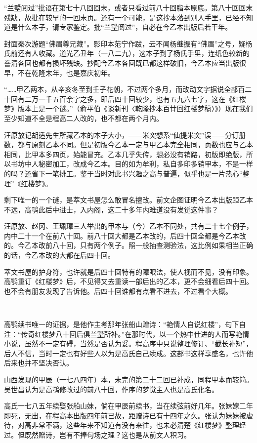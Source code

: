 \par “兰墅阅过”批语在第七十八回回末，或者只看过前八十回脂本原底。第八十回回末残缺，故批在较早的一回末页。还有一个可能，是这抄本落到别人手里，已经不知道是什么本子，请专家鉴定。批“兰墅阅过”，自必在今乙本出版后若干年。
\par 封面秦次游题“佛眉尊兄藏”。影印本范宁作跋，云不闻杨继振有“佛眉”之号，疑杨氏前还有人收藏。道光乙丑年（一八二九），这本子到了杨氏手里，连纸色较新的誊清各回也都有损坏残缺。抄配今乙本各回既已都这样破旧，今乙本应当出版很早，不在乾隆末年，也是嘉庆初年。
\par “……甲乙两本，从辛亥冬至到壬子花朝，不过两个多月，而改动文字据说全部百二十回有二万一千五百余字之多，即后四十回较少，也有五九六七字，这在《红楼梦》版本上是一个谜。”（俞平伯《谈新刊〈乾隆抄本百廿回红楼梦稿〉》）现在我们至少知道不全是程高二人改的，也不都在两个月内。
\par 汪原放记胡适先生所藏乙本的本子大小，——米突想系“仙提米突”误——分订册数，都与原刻乙本不同。但是初版今乙本一定与甲乙本完全相同，页数也应与乙本相同，比甲本多四页，始能冒充。乙本几乎失传，想必没有销路，初版即绝版，所以书坊中人秘密加工，改成今乙本。目的如为牟利，私自多印多销甲本，不是一样的吗？还省下一笔排工。鉴于当时对此书兴趣之高与普遍，似乎也是一片热心“整理”《红楼梦》。
\par 剩下唯一的一个谜，是萃文书屋怎么敢冒名擅改。前文企图证明今乙本出版距乙本不远，高鹗此后中进士，入内阁，这二十多年内难道没有发觉这件事？
\par 汪原放、赵冈、王珮璋三人举出的甲本与（今）乙本不同处，共有二十七个例子，内中二十一个在前八十回。前八十回大都是乙本改的，后四十回全都是今乙本改的。今乙本改前八十回，只有两个例子。照一般抽查测验法，这比例如果相当正确的话，今乙本改的大都在后四十回。
\par 萃文书屋的护身符，也许就是后四十回特有的障眼法，使人视而不见，没有印象。高鹗重订《红楼梦》后，不见得又去重读一部后出的乙本，更不会细看后四十回。也不会有朋友发现了告诉他。后四十回谁都有点看不进去，不过看个大概。
\par  
\par 高鹗续书唯一的证据，是他作主考那年张船山赠诗：“艳情人自说红楼”，句下自注：“传奇红楼梦八十回后俱兰墅所补。”在那时代，以一个热中仕进的人而写艳情小说，虽然不一定有碍，当然是否认为妥。程高序中只说整理修订、“截长补短”，后人不信，当时一定也有好些人以为是高氏自己续成。这部书这样享盛名，也许他后来也并不坚决否认。
\par 山西发现的甲辰（一七八四年）本，未完的第二十二回已补成，同程甲本而较简。吴世昌认为是高鹗修改过的前八十回，作序的梦觉主人也是高氏化名。
\par 高氏一七八五年续娶张船山妹，倘在甲辰前续书，当在续弦前好几年。张妹嫁二年即死，无出，在程高本出版四年前已故，距赠诗已有十四年之久。张认为妹妹被虐待，对高非常不满，这些年来不知道有没有来往，也未必清楚《红楼梦》整理经过。但既然赠诗，岂有不捧句场之理？这也是从前文人积习。

